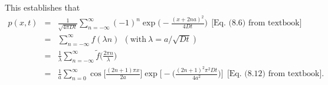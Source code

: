 This establishes that
\begin{eqnarray}
p(x,t) &=& \boxed{\frac{1}{\sqrt{4 \pi D t}} \sum_{n=-\infty}^{\infty} (-1)^n \exp \bigg( -\frac{(x+2na)^2}{4Dt} \bigg)} \nonumber~~\text{[Eq. (8.6) from textbook]} \\
&=& \sum_{n=-\infty}^{\infty} f(\lambda n)~~(\text{with}~\lambda = a/\sqrt{Dt}) \nonumber \\
&=& \frac{1}{\lambda} \sum_{n=-\infty}^{\infty} \tilde{f}\bigg(\frac{2 \pi n}{\lambda}\bigg) \nonumber \\
&=& \boxed{\frac{1}{a} \sum_{n=0}^{\infty}\cos \bigg[ \frac{(2n+1) \pi x}{2 a } \bigg] \exp \bigg[ - \bigg( \frac{(2n+1)^2 \pi^2 D t}{4 a^2} \bigg) \bigg]}~~\text{[Eq. (8.12) from textbook]}. \nonumber 
\end{eqnarray}
